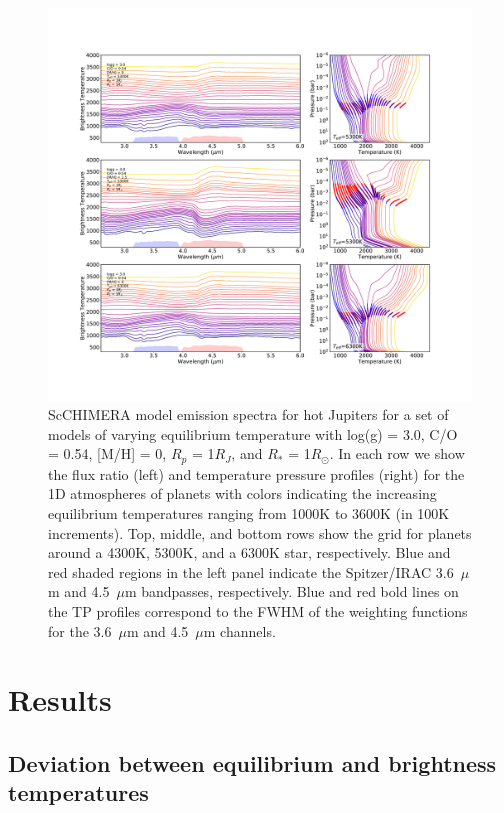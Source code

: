 \begin{figure}
    \centering
    \includegraphics[width=\linewidth]{SpectraTPweight.pdf}
    \caption{ScCHIMERA model emission spectra for hot Jupiters \citep{Piskorz2018} for a set of models of varying equilibrium temperature with log(g) = 3.0, C/O = 0.54, [M/H] = 0, $R_p$ = 1$R_J$, and $R_*$ = 1$R_\odot$. In each row we show the flux ratio (left) and temperature pressure profiles (right) for the 1D atmospheres of planets with colors indicating the increasing equilibrium temperatures ranging from 1000K to 3600K (in 100K increments). Top, middle, and bottom rows show the grid for planets around a 4300K, 5300K, and a 6300K star, respectively. Blue and red shaded regions in the left panel indicate the Spitzer/IRAC 3.6~$\mu$m and 4.5~$\mu$m bandpasses, respectively. Blue and red bold lines on the TP profiles correspond to the FWHM of the weighting functions for the 3.6~$\mu$m and 4.5~$\mu$m channels.}
    \label{P2:fig:Linemodels}
\end{figure}



\section{Results}
\label{P2:sec:results}

\subsection{Deviation between equilibrium and brightness temperatures}
\label{P2:sec:individualTb}

